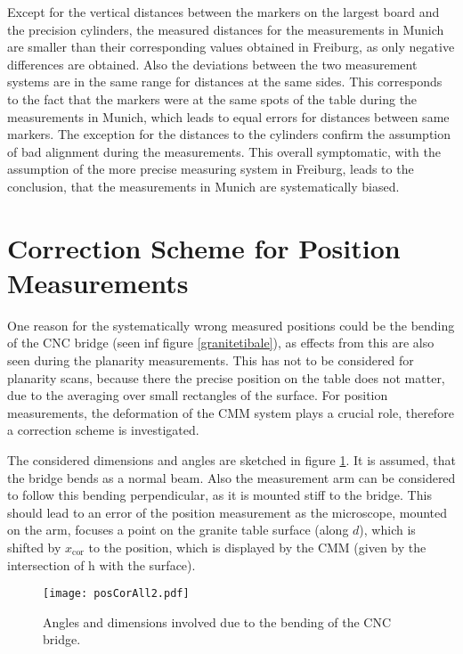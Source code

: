 \documentclass[
a4paper,                                %
twoside,                                %
BCOR1.4cm,                      %
10pt,                           %
headings=normal,                %
headsepline,                    %
clearplainpage, %
final,                                  %
div=14,
parskip=full,
openright,
bibliography=toc
]{scrreprt}
\begin{document}
Except for the vertical distances between the markers on the largest board and the precision cylinders, the measured distances for the measurements in Munich are smaller than their corresponding values obtained in Freiburg, as only negative differences are obtained. Also the deviations between the two measurement systems are in the same range for distances at the same sides. This corresponds to the fact that the markers were at the same spots of the table during the measurements in Munich, which leads to equal errors for distances between same markers. The exception for the distances to the cylinders confirm the assumption of bad alignment during the measurements. This overall symptomatic, with the assumption of the more precise measuring system in Freiburg, leads to the conclusion, that the measurements in Munich are systematically biased.

\section{Correction Scheme for Position Measurements}

One reason for the systematically wrong measured positions could be the bending of the CNC bridge (seen inf figure \ref{granitetibale}), as effects from this are also seen during the planarity measurements. This has not to be considered for planarity scans, because there the precise position on the table does not matter, due to the averaging over small rectangles of the surface. For position measurements, the deformation of the CMM system plays a crucial role, therefore a correction scheme is investigated. 

The considered dimensions and angles are sketched in figure \ref{xCorrSketch}. It is assumed, that the bridge bends as a normal beam. Also the measurement arm can be considered to follow this bending perpendicular, as it is mounted stiff to the bridge. This should lead to an error of the position measurement as the microscope, mounted on the arm, focuses a point on the granite table surface (along $d$), which is shifted by $x_{\mathrm{cor}}$ to the position, which is displayed by the CMM (given by the intersection of h with the surface). 

\begin{figure}[H]
	\centering
	\texttt{[image: posCorAll2.pdf]}
	\caption{Angles and dimensions involved due to the bending of the CNC bridge.}
	\label{xCorrSketch}
\end{figure}
\end{document}
